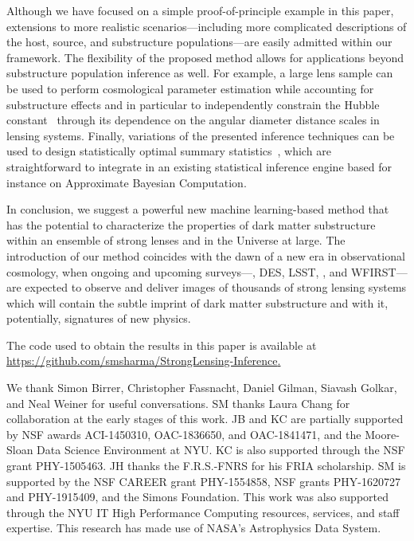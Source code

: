 \documentclass[twocolumn]{aastex63}
\begin{document}
Although we have focused on a simple proof-of-principle example in this paper, extensions to more realistic scenarios---including more complicated descriptions of the host, source, and substructure populations---are easily admitted within our framework.  The flexibility of the proposed method allows for applications beyond substructure population inference as well. For example, a large lens sample can be used to perform cosmological parameter estimation while accounting for substructure effects and in particular to independently constrain the Hubble constant~\citep{1907.02533,1907.04869} through its dependence on the angular diameter distance scales in lensing systems. Finally, variations of the presented inference techniques can be used to design statistically optimal summary statistics~\citep{1805.12244}, which are straightforward to integrate in an existing statistical inference engine based for instance on Approximate Bayesian Computation.

In conclusion, we suggest a powerful new machine learning-based method that has the potential to characterize the properties of dark matter substructure within an ensemble of strong lenses and in the Universe at large. The introduction of our method coincides with the dawn of a new era in observational cosmology, when ongoing and upcoming surveys---\eg, DES, LSST, \Euclid, and WFIRST---are expected to observe and deliver images of thousands of strong lensing systems which will contain the subtle imprint of dark matter substructure and with it, potentially, signatures of new physics.

The code used to obtain the results in this paper is available at \url{https://github.com/smsharma/StrongLensing-Inference}\href{https://github.com/smsharma/StrongLensing-Inference}.
\newpage

\acknowledgments
\newpage

We thank Simon Birrer, Christopher Fassnacht, Daniel Gilman, Siavash Golkar, and Neal Weiner for useful conversations. SM thanks Laura Chang for collaboration at the early stages of this work. JB and KC are partially supported by NSF awards ACI-1450310, OAC-1836650, and OAC-1841471, and the Moore-Sloan Data Science Environment at NYU. KC is also supported through the NSF grant PHY-1505463. JH thanks the F.R.S.-FNRS for his FRIA scholarship. SM is supported by the NSF CAREER grant PHY-1554858, NSF grants PHY-1620727 and PHY-1915409, and the Simons Foundation. This work was also supported through the NYU IT High Performance Computing resources, services, and staff expertise. This research has made use of NASA's Astrophysics Data System.
\end{document}
